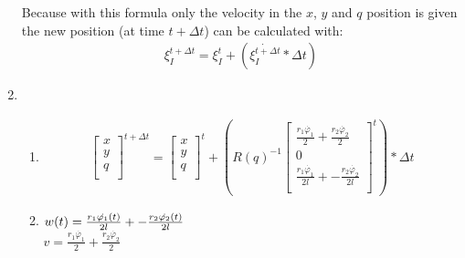 \documentclass[a4paper, 20pt]{report}
\begin{document}
\begin{enumerate}
        Because with this formula only the velocity in the $x$, $y$ and $q$
        position is given the new position (at time $t+\Delta t$) can be calculated with:
        \begin{align*}
            \xi^{t + \Delta t}_I = \xi^{t}_I + (\dot{\xi^{t + \Delta t}_I} *\Delta t )
        \end{align*}
    \item
    \begin{enumerate}(a)
    \item
        \begin{align*}
            \begin{bmatrix}
            x\\
            y\\
            q\\
        \end{bmatrix}^{t + \Delta t}
            = 
            \begin{bmatrix}
            x\\
            y\\
            q\\
        \end{bmatrix}^{t}
        +( R(q)^{-1}  
            \begin{bmatrix}
                \frac{r_1\dot{\varphi_1}}{2} + \frac{r_2\dot{\varphi_2}}{2}\\
            0\\
           \frac{r_1\dot{\varphi_1}}{2l} + -\frac{r_2\dot{\varphi_2}}{2l}\\ 
       \end{bmatrix}^{t}) * \Delta t
        \end{align*}
    \item
        $ w(t) = \large{\frac{r_1\dot{\varphi_1}(t)}{2l} +
        -\frac{r_2\dot{\varphi_2}(t)}{2l}}$\\
        $ v = \frac{r_1\dot{\varphi_1}}{2} + \frac{r_2\dot{\varphi_2}}{2}$
    \end{enumerate}
\end{enumerate}
\end{document}
